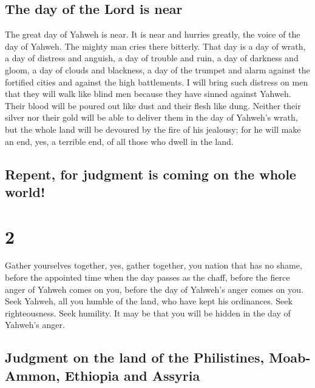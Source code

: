 \hypertarget{the-day-of-the-lord-is-near}{%
\subsection{The day of the Lord is
near}\label{the-day-of-the-lord-is-near}}

 The great day of Yahweh is near. It is near and hurries
greatly, the voice of the day of Yahweh. The mighty man cries there
bitterly.  That day is a day of wrath, a day of distress
and anguish, a day of trouble and ruin, a day of darkness and gloom, a
day of clouds and blackness,  a day of the trumpet and
alarm against the fortified cities and against the high battlements.
 I will bring such distress on men that they will walk
like blind men because they have sinned against Yahweh. Their blood will
be poured out like dust and their flesh like dung. 
Neither their silver nor their gold will be able to deliver them in the
day of Yahweh's wrath, but the whole land will be devoured by the fire
of his jealousy; for he will make an end, yes, a terrible end, of all
those who dwell in the land.

\hypertarget{repent-for-judgment-is-coming-on-the-whole-world}{%
\subsection{Repent, for judgment is coming on the whole
world!}\label{repent-for-judgment-is-coming-on-the-whole-world}}

\hypertarget{section-1}{%
\section{2}\label{section-1}}

 Gather yourselves together, yes, gather together, you
nation that has no shame,  before the appointed time when
the day passes as the chaff, before the fierce anger of Yahweh comes on
you, before the day of Yahweh's anger comes on you.  Seek
Yahweh, all you humble of the land, who have kept his ordinances. Seek
righteousness. Seek humility. It may be that you will be hidden in the
day of Yahweh's anger.

\hypertarget{judgment-on-the-land-of-the-philistines-moab-ammon-ethiopia-and-assyria}{%
\subsection{Judgment on the land of the Philistines, Moab-Ammon,
Ethiopia and
Assyria}\label{judgment-on-the-land-of-the-philistines-moab-ammon-ethiopia-and-assyria}}

